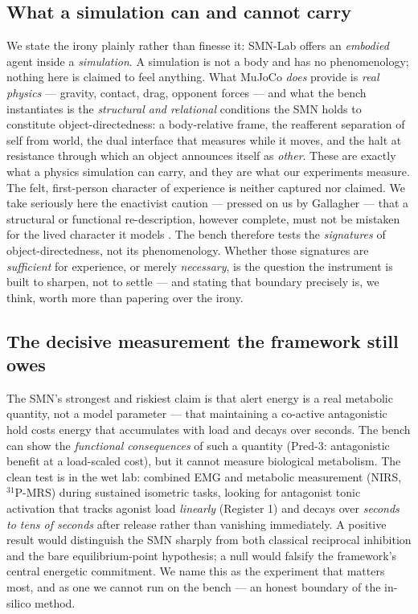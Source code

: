\documentclass[utf8]{FrontiersinHarvard} %
\begin{document}
\subsection{What a simulation can and cannot carry}\label{sec:disc-sim}
We state the irony plainly rather than finesse it: SMN-Lab offers an \emph{embodied} agent inside a \emph{simulation}. A simulation is not a body and has no phenomenology; nothing here is claimed to feel anything. What MuJoCo \emph{does} provide is \emph{real physics} --- gravity, contact, drag, opponent forces --- and what the bench instantiates is the \emph{structural and relational} conditions the SMN holds to constitute object-directedness: a body-relative frame, the reafferent separation of self from world, the dual interface that measures while it moves, and the halt at resistance through which an object announces itself as \emph{other}. These are exactly what a physics simulation can carry, and they are what our experiments measure. The felt, first-person character of experience is neither captured nor claimed. We take seriously here the enactivist caution --- pressed on us by Gallagher --- that a structural or functional re-description, however complete, must not be mistaken for the lived character it models \citep{Gallagher2017Enactivist,gallagher2005how}.
The bench therefore tests the \emph{signatures} of object-directedness, not its phenomenology. Whether those signatures are \emph{sufficient} for experience, or merely \emph{necessary}, is the question the instrument is built to sharpen, not to settle --- and stating that boundary precisely is, we think, worth more than papering over the irony.

\subsection{The decisive measurement the framework still owes}\label{sec:disc-measurement}
The SMN's strongest and riskiest claim is that alert energy is a real metabolic quantity, not a model parameter --- that maintaining a co-active antagonistic hold costs energy that accumulates with load and decays over seconds. The bench can show the \emph{functional consequences} of such a quantity (Pred-3: antagonistic benefit at a load-scaled cost), but it cannot measure biological metabolism. The clean test is in the wet lab: combined EMG and metabolic measurement (NIRS, $^{31}$P-MRS) during sustained isometric tasks, looking for antagonist tonic activation that tracks agonist load \emph{linearly} (Register 1) and decays over \emph{seconds to tens of seconds} after release rather than vanishing immediately. A positive result would distinguish the SMN sharply from both classical reciprocal inhibition and the bare equilibrium-point hypothesis; a null would falsify the framework's central energetic commitment. We name this as the experiment that matters most, and as one we cannot run on the bench --- an honest boundary of the in-silico method.
\end{document}
